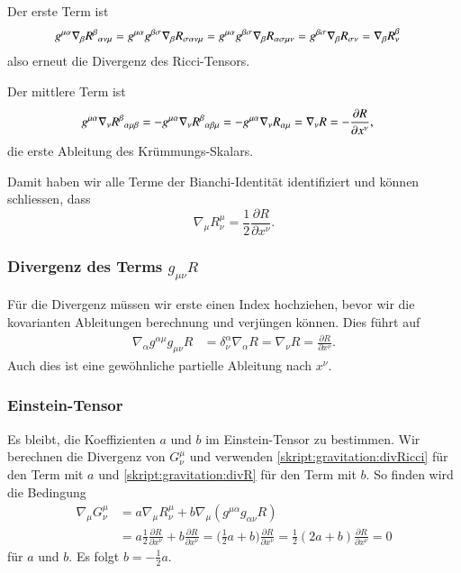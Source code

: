 Der erste Term ist 
\begin{align*}
g^{\mu\alpha}
\nabla_\beta R^\beta\mathstrut_{\alpha\nu\mu}
&=
g^{\mu\alpha}
g^{\beta\sigma}
\nabla_\beta R_{\sigma\alpha\nu\mu}
=
g^{\mu\alpha}
g^{\beta\sigma}
\nabla_\beta R_{\alpha\sigma\mu\nu}
=
g^{\beta\sigma}
\nabla_\beta R_{\sigma\nu}
=
\nabla_\beta R^\beta_\nu
\end{align*}
also erneut die Divergenz des Ricci-Tensors.

Der mittlere Term ist 
\begin{align*}
g^{\mu\alpha}
\nabla_\nu R^\beta\mathstrut_{\alpha\mu\beta}
&=
-
g^{\mu\alpha}
\nabla_\nu R^\beta\mathstrut_{\alpha\beta\mu}
=
-g^{\mu\alpha}
\nabla_\nu R_{\alpha\mu}
=
\nabla_\nu R
=
-\frac{\partial R}{\partial x^\nu},
\end{align*}
die erste Ableitung des Krümmungs-Skalars.

Damit haben wir alle Terme der Bianchi-Identität identifiziert und können
schliessen, dass
\begin{equation}
\nabla_\mu R^\mu_\nu
=
\frac12\frac{\partial R}{\partial x^\nu}.
\label{skript:gravitation:divRicci}
\end{equation}

\subsubsection{Divergenz des Terms $g_{\mu\nu}R$}
Für die Divergenz müssen wir erste einen Index hochziehen, bevor
wir die kovarianten Ableitungen berechnung und verjüngen können.
Dies führt auf
\begin{align}
\nabla_\alpha g^{\alpha\mu}g_{\mu\nu}R
&=
\delta^\alpha_\nu \nabla_\alpha R
=
\nabla_\nu R
=
\frac{\partial R}{\partial x^\nu}.
\label{skript:gravitation:divR}
\end{align}
Auch dies ist eine gewöhnliche partielle Ableitung nach $x^\nu$.

\subsubsection{Einstein-Tensor}
Es bleibt, die Koeffizienten $a$ und $b$ im Einstein-Tensor zu
bestimmen.
Wir berechnen die Divergenz von $G^\mu_\nu$ und verwenden
\eqref{skript:gravitation:divRicci} für den Term mit $a$ und
\eqref{skript:gravitation:divR} für den Term mit $b$.
So finden wird die Bedingung
\begin{align*}
\nabla_\mu G^\mu_\nu
&=
a \nabla_\mu R^\mu_\nu + b \nabla_\mu (g^{\mu\alpha}g_{\alpha\nu} R)
\\
&=
a \frac12\frac{\partial R}{\partial x^\nu}
+
b \frac{\partial R}{\partial x^\nu}
=
\biggl(\frac12a+b\biggr)
\frac{\partial R}{\partial x^\nu}
=
\frac12(2a+b)
\frac{\partial R}{\partial x^\nu}
=
0
\end{align*}
für $a$ und $b$.
Es folgt $b = -\frac12a$.

